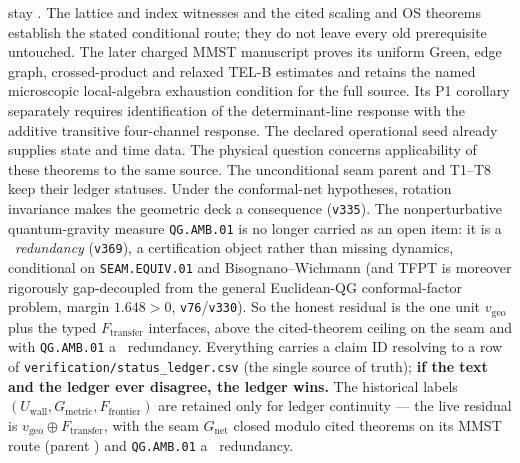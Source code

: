 \begin{keybox}
stay \mO. The lattice and index witnesses and the cited scaling and OS theorems
establish the stated conditional route; they do not leave every old prerequisite
untouched. The later charged MMST manuscript proves its uniform Green, edge graph,
crossed-product and relaxed TEL-B estimates and retains the named microscopic
local-algebra exhaustion condition for the full source. Its P1 corollary separately
requires identification of the determinant-line response with the additive
transitive four-channel response. The declared operational seed already supplies
state and time data. The physical question concerns applicability of these
theorems to the same source. The unconditional seam parent and T1--T8 keep their
ledger statuses. Under the conformal-net hypotheses, rotation invariance makes
the geometric deck a consequence (\texttt{v335}). The nonperturbative quantum-gravity measure \texttt{QG.AMB.01} is no longer carried as an
open item: it is a \mC\ \emph{redundancy} (\texttt{v369}), a certification object rather than missing dynamics,
conditional on \texttt{SEAM.EQUIV.01} and Bisognano--Wichmann (and TFPT is moreover rigorously gap-decoupled from the
general Euclidean-QG conformal-factor problem, margin $1.648>0$, \texttt{v76}/\texttt{v330}). So the honest residual is
the one unit $v_{\mathrm{geo}}$ plus the typed $F_{\mathrm{transfer}}$ interfaces, above the cited-theorem ceiling on
the seam and with \texttt{QG.AMB.01} a \mC\ redundancy.
\noindent Everything carries a claim ID resolving to a row of \texttt{verification/status\_ledger.csv}
(the single source of truth); \textbf{if the text and the ledger ever disagree, the ledger wins.} The
historical labels $(U_{\mathrm{wall}},G_{\mathrm{metric}},F_{\mathrm{frontier}})$ are retained only for
ledger continuity --- the live residual is $v_{\mathrm{geo}}\oplus F_{\mathrm{transfer}}$, with the seam
$G_{\mathrm{net}}$ closed modulo cited theorems on its MMST route (parent \mO) and \texttt{QG.AMB.01} a \mC\
redundancy.
\markerkey
\end{keybox}
